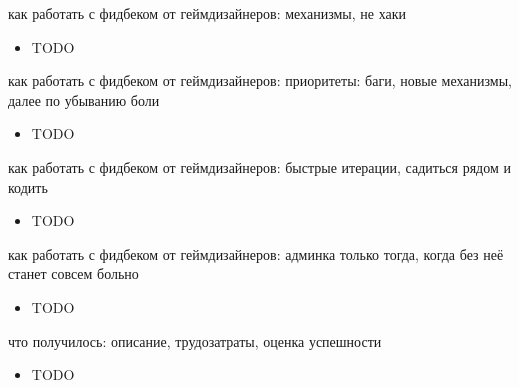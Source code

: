 \documentclass[aspectratio=169,handout,bigger]{beamer}
\begin{document}

\begin{frame}{как работать с фидбеком от геймдизайнеров: механизмы, не хаки}
  \begin{itemize}
    \item TODO
  \end{itemize}
\end{frame}


\begin{frame}{как работать с фидбеком от геймдизайнеров: приоритеты: баги, новые механизмы, далее по убыванию боли}
  \begin{itemize}
    \item TODO
  \end{itemize}
\end{frame}


\begin{frame}{как работать с фидбеком от геймдизайнеров: быстрые итерации, садиться рядом и кодить}
  \begin{itemize}
    \item TODO
  \end{itemize}
\end{frame}


\begin{frame}{как работать с фидбеком от геймдизайнеров: админка только тогда, когда без неё станет совсем больно}
  \begin{itemize}
    \item TODO
  \end{itemize}
\end{frame}


\begin{frame}{что получилось: описание, трудозатраты, оценка успешности}
  \begin{itemize}
    \item TODO
  \end{itemize}
\end{frame}
\end{document}
